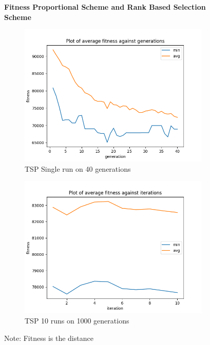 \documentclass[a4paper]{exam}
\begin{document}
\begin{questions}
  \begin{figure}[H]
    \centering
    \textbf{Fitness Proportional Scheme and Rank Based Selection Scheme}
    \begin{subfigure}{.5\textwidth}
      \centering
      \includegraphics[width=1\linewidth]{images/tsp_fps_rbs_gen.png}
      \caption{TSP Single run on 40 generations}
      \label{fig:tsp_fps_rbs_sub1}
    \end{subfigure}%
    \begin{subfigure}{.5\textwidth}
      \centering
      \includegraphics[width=1\linewidth]{images/tsp_fps_rbs_itr.png}
      \caption{TSP 10 runs on 1000 generations}
      \label{fig:tsp_fps_rbs_sub2}
    \end{subfigure}
    \caption{Note: Fitness is the distance}
    \label{fig:tsp_fps_rbs}
  \end{figure}


\end{questions}
\end{document}

